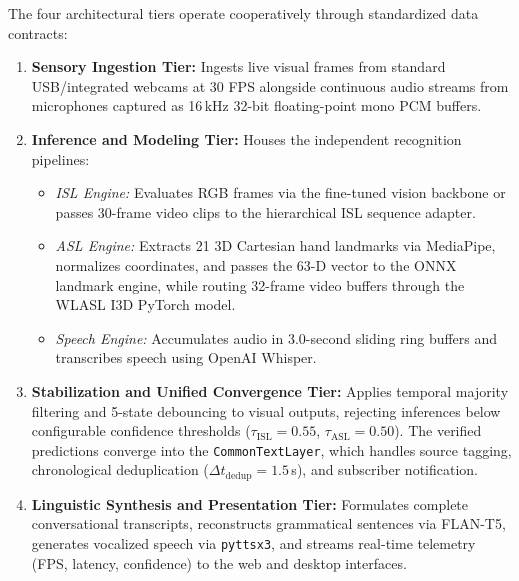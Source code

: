 \documentclass[12pt,a4paper]{report}
\begin{document}
The four architectural tiers operate cooperatively through standardized data contracts:
\begin{enumerate}[noitemsep, topsep=2pt]
\item \textbf{Sensory Ingestion Tier:} Ingests live visual frames from standard USB/integrated webcams at 30 FPS alongside continuous audio streams from microphones captured as 16\,kHz 32-bit floating-point mono PCM buffers.
\item \textbf{Inference and Modeling Tier:} Houses the independent recognition pipelines:
\begin{itemize}[noitemsep]
\item \textit{ISL Engine:} Evaluates RGB frames via the fine-tuned vision backbone or passes 30-frame video clips to the hierarchical ISL sequence adapter.
\item \textit{ASL Engine:} Extracts 21 3D Cartesian hand landmarks via MediaPipe, normalizes coordinates, and passes the 63-D vector to the ONNX landmark engine, while routing 32-frame video buffers through the WLASL I3D PyTorch model.
\item \textit{Speech Engine:} Accumulates audio in 3.0-second sliding ring buffers and transcribes speech using OpenAI Whisper.
\end{itemize}
\item \textbf{Stabilization and Unified Convergence Tier:} Applies temporal majority filtering and 5-state debouncing to visual outputs, rejecting inferences below configurable confidence thresholds ($\tau_{\text{ISL}}=0.55$, $\tau_{\text{ASL}}=0.50$). The verified predictions converge into the \texttt{CommonTextLayer}, which handles source tagging, chronological deduplication ($\Delta t_{\text{dedup}}=1.5$\,s), and subscriber notification.
\item \textbf{Linguistic Synthesis and Presentation Tier:} Formulates complete conversational transcripts, reconstructs grammatical sentences via FLAN-T5, generates vocalized speech via \texttt{pyttsx3}, and streams real-time telemetry (FPS, latency, confidence) to the web and desktop interfaces.
\end{enumerate}
\end{document}
